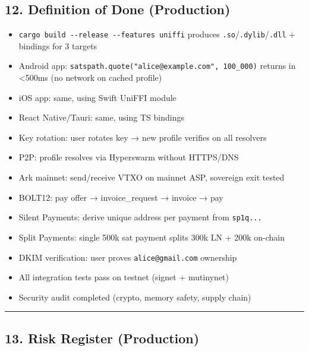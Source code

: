 \documentclass[
]{article}
\providecommand{\tightlist}{%
  \setlength{\itemsep}{0pt}\setlength{\parskip}{0pt}}
\begin{document}
\hypertarget{definition-of-done-production}{%
\subsection{12. Definition of Done
(Production)}\label{definition-of-done-production}}

\begin{itemize}
\tightlist
\item[$\square$]
  \texttt{cargo\ build\ -\/-release\ -\/-features\ uniffi} produces
  \texttt{.so}/\texttt{.dylib}/\texttt{.dll} + bindings for 3 targets
\item[$\square$]
  Android app: \texttt{satspath.quote("alice@example.com",\ 100\_000)}
  returns in \textless500ms (no network on cached profile)
\item[$\square$]
  iOS app: same, using Swift UniFFI module
\item[$\square$]
  React Native/Tauri: same, using TS bindings
\item[$\square$]
  Key rotation: user rotates key → new profile verifies on all resolvers
\item[$\square$]
  P2P: profile resolves via Hyperswarm without HTTPS/DNS
\item[$\square$]
  Ark mainnet: send/receive VTXO on mainnet ASP, sovereign exit tested
\item[$\square$]
  BOLT12: pay offer → invoice\_request → invoice → pay
\item[$\square$]
  Silent Payments: derive unique address per payment from
  \texttt{sp1q...}
\item[$\square$]
  Split Payments: single 500k sat payment splits 300k LN + 200k on-chain
\item[$\square$]
  DKIM verification: user proves \texttt{alice@gmail.com} ownership
\item[$\square$]
  All integration tests pass on testnet (signet + mutinynet)
\item[$\square$]
  Security audit completed (crypto, memory safety, supply chain)
\end{itemize}

\begin{center}\rule{0.5\linewidth}{0.5pt}\end{center}

\hypertarget{risk-register-production}{%
\subsection{13. Risk Register
(Production)}\label{risk-register-production}}
\end{document}
